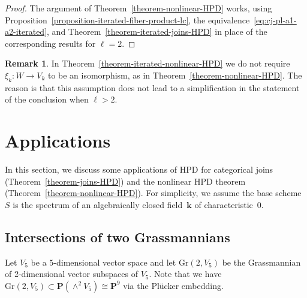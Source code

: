\documentclass[11pt, reqno]{amsart}
\numberwithin{equation}{section}
\theoremstyle{plain}
\theoremstyle{definition}
\newtheorem{remark}[theorem]{Remark}
\newcommand{\Gr}{\mathrm{Gr}}
\newcommand{\bP}{\mathbf{P}}
\newcommand{\bk}{\mathbf{k}}
\begin{document}
\begin{proof}
The argument of Theorem~\ref{theorem-nonlinear-HPD} works, using Proposition~\ref{proposition-iterated-fiber-product-lc}, the equivalence~\eqref{eq:cj-pl-a1-a2-iterated}, and Theorem~\ref{theorem-iterated-joins-HPD}   
in place of the corresponding results for $\ell=2$.
\end{proof}

\begin{remark}
In Theorem~\ref{theorem-iterated-nonlinear-HPD} we do not require $\xi_k \colon W \to V_k$ 
to be an isomorphism, as in Theorem~\ref{theorem-nonlinear-HPD}. 
The reason is that this assumption does not lead to a simplification in the 
statement of the conclusion when $\ell > 2$. 
\end{remark}




\section{Applications}
\label{section:applications}

In this section, we discuss some applications of  
HPD for categorical joins (Theorem~\ref{theorem-joins-HPD}) and the nonlinear HPD theorem (Theorem~\ref{theorem-nonlinear-HPD}).  
For simplicity, we assume the base scheme $S$ is the spectrum of an algebraically closed field~$\bk$ of characteristic~$0$. 

\subsection{Intersections of two Grassmannians} 
\label{subsection:intersection-gr25}
Let $V_5$ be a $5$-dimensional vector space and let $\Gr(2,V_5)$ be the Grassmannian of 2-dimensional vector subspaces of $V_5$.
Note that we have~$\Gr(2,V_5) \subset \bP(\wedge^2 V_5) \cong \bP^9$ via the Pl\"{u}cker embedding. 
 
\end{document}
